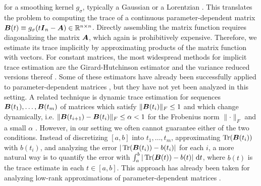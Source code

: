 \documentclass[12pt]{article}
\begin{document}
for a smoothing kernel $g_{\sigma}$, typically a Gaussian \cite{lin-2016-approximating-spectral, lin-2017-randomized-estimation} or a Lorentzian \cite{haydock-1972-electronic-structure, lin-2016-approximating-spectral}. This translates the problem to computing the trace of a continuous parameter-dependent matrix $\boldsymbol{B}(t) \equiv g_{\sigma}(t \boldsymbol{I}_n - \boldsymbol{A}) \in \mathbb{R}^{n \times n}$. Directly assembling the matrix function requires diagonalizing the matrix $\boldsymbol{A}$, which again is prohibitively expensive. Therefore, we estimate its trace implicitly by approximating products of the matrix function with vectors. For constant matrices, the most widespread methods for implicit trace estimation are the Girard-Hutchinson estimator \cite{girard-1989-fast-montecarlo, hutchinson-1990-stochastic-estimator} and the variance reduced versions thereof \cite{gambhir-2017-deflation-method, saibaba-2017-randomized-matrixfree, lin-2017-randomized-estimation, meyer-2021-hutch-optimal, persson-2022-improved-variants, epperly-2024-xtrace-making, chen-2023-krylovaware-stochastic}. Some of these estimators have already been successfully applied to parameter-dependent matrices \cite{lin-2017-randomized-estimation,chen-2023-krylovaware-stochastic}, but they have not yet been analyzed in this setting. A related technique is dynamic trace estimation for sequences $\boldsymbol{B}(t_1), \dots, \boldsymbol{B}(t_m)$ of matrices which satisfy $\lVert \boldsymbol{B}(t_i) \rVert _F \leq 1$ and which change dynamically, i.e. $\lVert \boldsymbol{B}(t_{i+1}) - \boldsymbol{B}(t_i) \rVert _F \leq \alpha < 1$ for the Frobenius norm $\lVert \cdot \rVert _F$ and a small $\alpha$ \cite{woodruff-2022-optimal-query, dharangutte-2021-dynamic-trace}. However, in our setting we often cannot guarantee either of the two conditions. Instead of discretizing $[a, b]$ into $t_1, \ldots, t_m$, approximating $\operatorname{Tr}(\boldsymbol{B}(t_i))$ with $b(t_i)$, and analyzing the error $|\operatorname{Tr}(\boldsymbol{B}(t_i)) - b(t_i)|$ for each $i$, a more natural way is to quantify the error with $\int_{a}^{b} | \operatorname{Tr}(\boldsymbol{B}(t)) - b(t) |~\mathrm{d}t$, where $b(t)$ is the trace estimate in each $t \in [a, b]$. This approach has already been taken for analyzing low-rank approximations of parameter-dependent matrices \cite{kressner-2023-randomized-lowrank}.
\end{document}
